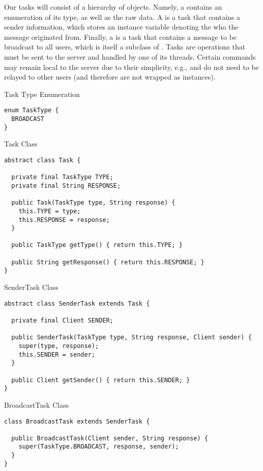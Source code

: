 Our tasks will consist of a hierarchy of objects. Namely, a  contains an enumeration of its type, as well as the raw data. A  is a task that contains a sender information, which stores an instance variable denoting the  who the message originated from. Finally, a  is a task that contains a message to be broadcast to all users, which is itself a subclass of . Tasks are operations that must be sent to the server and handled by one of its threads. Certain commands may remain local to the server due to their simplicity, e.g.,  and  do not need to be relayed to other users (and therefore are not wrapped as  instances). 

\begin{cl}[]{Task Type Enumeration}
\begin{lstlisting}[language=MyJava]
enum TaskType {
  BROADCAST
}
\end{lstlisting}
\end{cl}

\begin{cl}[]{Task Class}
\begin{lstlisting}[language=MyJava]
abstract class Task {

  private final TaskType TYPE;
  private final String RESPONSE;

  public Task(TaskType type, String response) {
    this.TYPE = type;
    this.RESPONSE = response;
  }

  public TaskType getType() { return this.TYPE; }

  public String getResponse() { return this.RESPONSE; }
}
\end{lstlisting}
\end{cl}

\begin{cl}[]{SenderTask Class}
\begin{lstlisting}[language=MyJava]
abstract class SenderTask extends Task {

  private final Client SENDER;

  public SenderTask(TaskType type, String response, Client sender) {
    super(type, response);
    this.SENDER = sender;
  }

  public Client getSender() { return this.SENDER; }
}
\end{lstlisting}
\end{cl}

\begin{cl}[]{BroadcastTask Class}
\begin{lstlisting}[language=MyJava]
class BroadcastTask extends SenderTask {

  public BroadcastTask(Client sender, String response) {
    super(TaskType.BROADCAST, response, sender);
  }
}
\end{lstlisting}
\end{cl}


